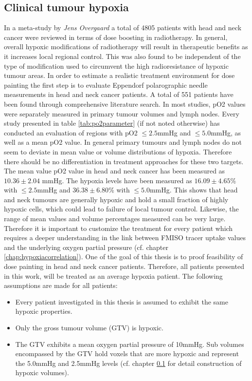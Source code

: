 \subsection{Clinical tumour hypoxia}\label{chap:tumourhypoxia}
In a meta-study by \textit{Jens Overgaard} \cite{pmid21511351} a total of 4805 patients with head and neck cancer were reviewed in terms of dose boosting in radiotherapy. In general, overall hypoxic modifications of radiotherapy will result in therapeutic benefits as it increases local regional control. This was also found to be independent of the type of modification used to circumvent the high radioresistance of hypoxic tumour areas. In order to estimate a realistic treatment environment for dose painting the first step is to evaluate Eppendorf polarographic needle measurements in head and neck cancer patients. A total of 551 patients have been found through comprehensive literature search. In most studies, pO2 values were separately measured in primary tumour volumes and lymph nodes. Every study presented in table \ref{tab:po2parameter} (if not noted otherwise) has conducted an evaluation of regions with pO2 $\leq 2.5$mmHg and $\leq 5.0$mmHg, as well as a mean pO2 value. In general primary tumours and lymph nodes do not seem to deviate in mean value or volume distributions of hypoxia. Therefore there should be no differentiation in treatment approaches for these two targets. The mean value pO2 value in head and neck cancer has been measured as $10.36 \pm 2.04$ mmHg. The hypoxia levels have been measured as $16.09 \pm 4.65$\% with $\leq 2.5$mmHg and  $36.38 \pm 6.80$\% with $\leq 5.0$mmHg. This shows that head and neck tumours are generally hypoxic and hold a small fraction of highly hypoxic cells, which could lead to failure of local tumour control. Likewise, the range of mean values and volume percentages measured can be very large. Therefore it is important to customize the treatment for every patient which requires a deeper understanding in the link between FMISO tracer uptake values and the underlying oxygen partial pressure (cf. chapter \ref{chap:hypoxiacorrelation}). One of the goal of this thesis is to proof feasibility of dose painting in head and neck cancer patients. Therefore, all patients presented in this work, will be treated as an average hypoxia patient. The following assumptions are made for all patients:
\begin{itemize}
\item Every patient investigated in this thesis is assumed to exhibit the same hypoxic properties.
\item Only the gross tumour volume (GTV) is hypoxic. 
\item The GTV exhibits a mean oxygen partial pressure of 10mmHg. Sub volumes encompassed by the GTV hold voxels that are more hypoxic and represent the 5.0mmHg and 2.5mmHg levels (cf. chapter \ref{chap:tumourhypoxia} for detail construction of hypoxic volumes).
\end{itemize}
